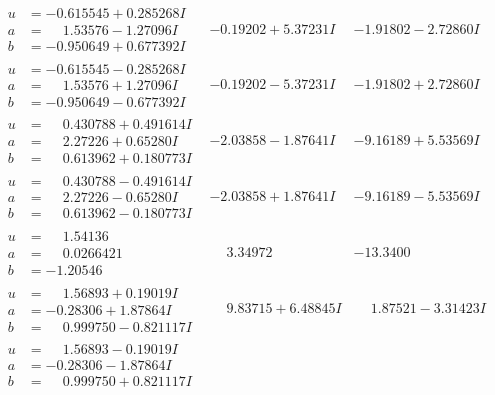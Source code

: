 \documentclass[1p]{elsarticle_modified}
\theoremstyle{definition}
\begin{document}
$$\begin{array}{c|c|c}
\begin{aligned}
u &= -0.615545 + 0.285268 I \\
a &= \phantom{-}1.53576 - 1.27096 I \\
b &= -0.950649 + 0.677392 I\end{aligned}
 & -0.19202 + 5.37231 I & -1.91802 - 2.72860 I \\ \hline\begin{aligned}
u &= -0.615545 - 0.285268 I \\
a &= \phantom{-}1.53576 + 1.27096 I \\
b &= -0.950649 - 0.677392 I\end{aligned}
 & -0.19202 - 5.37231 I & -1.91802 + 2.72860 I \\ \hline\begin{aligned}
u &= \phantom{-}0.430788 + 0.491614 I \\
a &= \phantom{-}2.27226 + 0.65280 I \\
b &= \phantom{-}0.613962 + 0.180773 I\end{aligned}
 & -2.03858 - 1.87641 I & -9.16189 + 5.53569 I \\ \hline\begin{aligned}
u &= \phantom{-}0.430788 - 0.491614 I \\
a &= \phantom{-}2.27226 - 0.65280 I \\
b &= \phantom{-}0.613962 - 0.180773 I\end{aligned}
 & -2.03858 + 1.87641 I & -9.16189 - 5.53569 I \\ \hline\begin{aligned}
u &= \phantom{-}1.54136\phantom{ +0.000000I} \\
a &= \phantom{-}0.0266421\phantom{ +0.000000I} \\
b &= -1.20546\phantom{ +0.000000I}\end{aligned}
 & \phantom{-}3.34972\phantom{ +0.000000I} & -13.3400\phantom{ +0.000000I} \\ \hline\begin{aligned}
u &= \phantom{-}1.56893 + 0.19019 I \\
a &= -0.28306 + 1.87864 I \\
b &= \phantom{-}0.999750 - 0.821117 I\end{aligned}
 & \phantom{-}9.83715 + 6.48845 I & \phantom{-}1.87521 - 3.31423 I \\ \hline\begin{aligned}
u &= \phantom{-}1.56893 - 0.19019 I \\
a &= -0.28306 - 1.87864 I \\
b &= \phantom{-}0.999750 + 0.821117 I\end{aligned}

\end{array}$$
\end{document}
